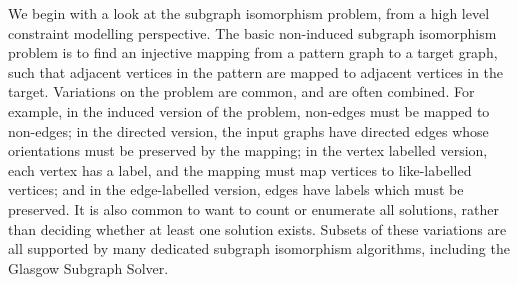 \documentclass[runningheads]{llncs}
\begin{document}
We begin with a look at the subgraph isomorphism problem, from a high level constraint modelling
perspective.  The basic non-induced subgraph isomorphism problem is to find an injective mapping
from a pattern graph to a target graph, such that adjacent vertices in the pattern are mapped to
adjacent vertices in the target. Variations on the problem are common, and are often combined. For
example, in the induced version of the problem, non-edges must be mapped to non-edges; in the
directed version, the input graphs have directed edges whose orientations must be preserved by the
mapping; in the vertex labelled version, each vertex has a label, and the mapping must map vertices
to like-labelled vertices; and in the edge-labelled version, edges have labels which must be
preserved.  It is also common to want to count or enumerate all solutions, rather than deciding
whether at least one solution exists.  Subsets of these variations are all supported by many
dedicated subgraph isomorphism algorithms, including the Glasgow Subgraph Solver.
\end{document}
